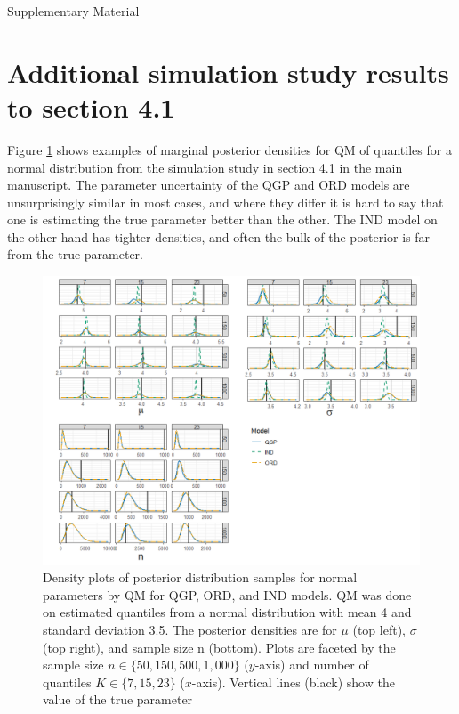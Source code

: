 \documentclass[preprint,12pt,authoryear]{elsarticle}
\begin{document}
% 



\Huge
\begin{center}
  Supplementary Material
\end{center}
\normalsize
 

\section*{Additional simulation study results to section 4.1}
Figure
\ref{fig:norm_dens} shows examples of marginal
posterior densities for QM of quantiles for a normal distribution from the
simulation study in section 4.1 in
the main manuscript. The parameter uncertainty of the QGP and ORD models are
unsurprisingly similar in
most cases, and where they differ it is hard to say that one is estimating the
true parameter better than the
other. The IND model on the other hand has tighter densities, and often the
bulk of the posterior is far from
the true parameter.


\begin{figure}[hbt!]
\centering
  \includegraphics[width = 1\linewidth]{Images/norm_params_fit.png}
\caption{Density plots of posterior distribution samples for normal parameters 
by QM for QGP, ORD, and
IND models. QM was done on estimated quantiles from a normal distribution with 
mean 4 and standard
deviation 3.5. The posterior densities are for $\mu$ (top left), 
$\sigma$ (top right), and 
sample size n (bottom). Plots are
faceted by the sample size $n \in \{50, 150, 500, 1,000\}$ 
($y$-axis) and number of 
quantiles $K \in \{7, 15, 23\}$ ($x$-axis).
Vertical lines (black) show the value of the true parameter}
\label{fig:norm_dens}
\end{figure}
\end{document}
